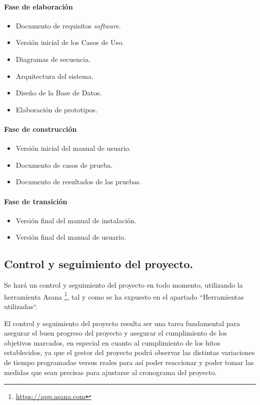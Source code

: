 \documentclass[twoside]{report}
\begin{document}
\paragraph{Fase de elaboración\\}
\begin{itemize}
\item Documento de requisitos \textit{software}.
\item Versión inicial de los Casos de Uso.
\item Diagramas de secuencia.
\item Arquitectura del sistema.
\item Diseño de la Base de Datos.
\item Elaboración de prototipos.
\end{itemize}

\paragraph{Fase de construcción\\}
\begin{itemize}
\item Versión inicial del manual de usuario.
\item Documento de casos de prueba.
\item Documento de resultados de las pruebas.
\end{itemize}

\paragraph{Fase de transición\\}
\begin{itemize}
\item Versión final del manual de instalación.
\item Versión final del manual de usuario.
\end{itemize}

\subsection{Control y seguimiento del proyecto.}

Se hará un control y seguimiento del proyecto en todo momento, utilizando la herramienta Asana \footnote{\url{https://app.asana.com}}, tal y como se ha expuesto en el apartado “Herramientas utilizadas“.

El control y seguimiento del proyecto resulta ser una tarea fundamental para asegurar el buen progreso del proyecto y asegurar el cumplimiento de los objetivos marcados, en especial en cuanto al cumplimiento de los hitos establecidos, ya que el gestor del proyecto podrá observar las distintas variaciones de tiempo programadas versus reales para así poder reaccionar y poder tomar las medidas que sean precisas para ajustarse al cronograma del proyecto.
\end{document}
